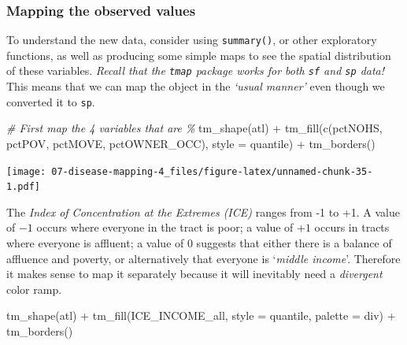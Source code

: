 \documentclass[
]{book}
\newenvironment{Shaded}{\begin{snugshade}}{\end{snugshade}}
\newcommand{\AttributeTok}[1]{\textcolor[rgb]{0.77,0.63,0.00}{#1}}
\newcommand{\CommentTok}[1]{\textcolor[rgb]{0.56,0.35,0.01}{\textit{#1}}}
\newcommand{\FunctionTok}[1]{\textcolor[rgb]{0.00,0.00,0.00}{#1}}
\newcommand{\NormalTok}[1]{#1}
\newcommand{\SpecialCharTok}[1]{\textcolor[rgb]{0.00,0.00,0.00}{#1}}
\newcommand{\StringTok}[1]{\textcolor[rgb]{0.31,0.60,0.02}{#1}}
\begin{document}
\hypertarget{mapping-the-observed-values}{%
\subsubsection{Mapping the observed values}\label{mapping-the-observed-values}}

To understand the new data, consider using \texttt{summary()}, or other exploratory functions, as well as producing some simple maps to see the spatial distribution of these variables. \emph{Recall that the \texttt{tmap} package works for both \texttt{sf} and \texttt{sp} data!} This means that we can map the object in the \emph{`usual manner'} even though we converted it to \texttt{sp}.

\begin{Shaded}
\begin{Highlighting}[]
\CommentTok{\# First map the 4 variables that are \%}
\FunctionTok{tm\_shape}\NormalTok{(atl) }\SpecialCharTok{+} 
  \FunctionTok{tm\_fill}\NormalTok{(}\FunctionTok{c}\NormalTok{(}\StringTok{\textquotesingle{}pctNOHS\textquotesingle{}}\NormalTok{, }\StringTok{\textquotesingle{}pctPOV\textquotesingle{}}\NormalTok{, }\StringTok{\textquotesingle{}pctMOVE\textquotesingle{}}\NormalTok{, }\StringTok{\textquotesingle{}pctOWNER\_OCC\textquotesingle{}}\NormalTok{),}
          \AttributeTok{style =} \StringTok{\textquotesingle{}quantile\textquotesingle{}}\NormalTok{) }\SpecialCharTok{+}
  \FunctionTok{tm\_borders}\NormalTok{()}
\end{Highlighting}
\end{Shaded}

\texttt{[image: 07-disease-mapping-4\_files/figure-latex/unnamed-chunk-35-1.pdf]}

The \emph{Index of Concentration at the Extremes (ICE)} ranges from -1 to +1. A value of \(-1\) occurs where everyone in the tract is poor; a value of \(+1\) occurs in tracts where everyone is affluent; a value of \(0\) suggests that either there is a balance of affluence and poverty, or alternatively that everyone is `\emph{middle income}'. Therefore it makes sense to map it separately because it will inevitably need a \emph{divergent} color ramp.

\begin{Shaded}
\begin{Highlighting}[]
\FunctionTok{tm\_shape}\NormalTok{(atl) }\SpecialCharTok{+}
  \FunctionTok{tm\_fill}\NormalTok{(}\StringTok{\textquotesingle{}ICE\_INCOME\_all\textquotesingle{}}\NormalTok{,}
          \AttributeTok{style =} \StringTok{\textquotesingle{}quantile\textquotesingle{}}\NormalTok{,}
          \AttributeTok{palette =} \StringTok{\textquotesingle{}div\textquotesingle{}}\NormalTok{) }\SpecialCharTok{+}
  \FunctionTok{tm\_borders}\NormalTok{()}
\end{Highlighting}
\end{Shaded}
\end{document}
